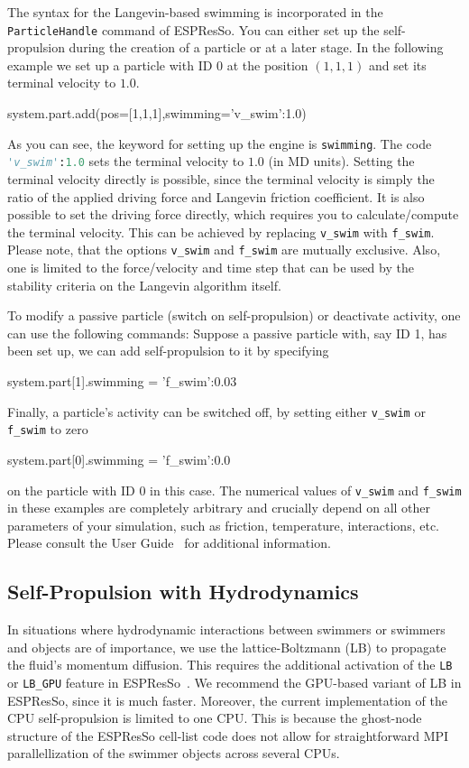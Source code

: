 \documentclass[aip,jcp,reprint,a4paper,onecolumn,amsmath]{revtex4-1}
\newcommand\code{\lstinline}
\newcommand{\es}{\mbox{\textsf{ESPResSo}}\xspace}
\newcommand\codees{\lstinline[language=python]}
\begin{document}
The syntax for the Langevin-based swimming is incorporated in the \codees{ParticleHandle} command of \es{}. You can either set up the self-propulsion during the creation of a particle or at a later stage. In the following example we set up a particle with ID 0 at the position $(1,1,1)$ and set its terminal velocity to $1.0$.
\begin{espresso}
system.part.add(pos=[1,1,1],swimming={'v_swim':1.0})
\end{espresso}
As you can see, the keyword for setting up the engine is \codees{swimming}. The code \codees{'v_swim':1.0} sets the terminal velocity to $1.0$ (in MD units). Setting the terminal velocity directly is possible, since the terminal velocity is simply the ratio of the applied driving force and Langevin friction coefficient. It is also possible to set the driving force directly, which requires you to calculate/compute the terminal velocity. This can be achieved by replacing \codees{v_swim} with \codees{f_swim}. Please note, that the options \codees{v_swim} and \codees{f_swim} are mutually exclusive. Also, one is limited to the force/velocity and time step that can be used by the stability criteria on the Langevin algorithm itself.

To modify a passive particle (switch on self-propulsion) or deactivate activity, one can use the following commands: Suppose a passive particle with, say ID 1, has been set up, we can add self-propulsion to it by specifying
\begin{espresso}
system.part[1].swimming = {'f_swim':0.03}
\end{espresso}
Finally, a particle's activity can be switched off, by setting either \codees{v_swim} or \codees{f_swim} to zero
\begin{espresso}
system.part[0].swimming = {'f_swim':0.0}
\end{espresso}
on the particle with ID 0 in this case. The numerical values of \codees{v_swim} and \codees{f_swim} in these examples are completely arbitrary and crucially depend on all other parameters of your simulation, such as friction, temperature, interactions, etc. Please consult the User Guide~\cite{UG} for additional information.

\subsection{\label{sub:lattice}Self-Propulsion with Hydrodynamics}

In situations where hydrodynamic interactions between swimmers or swimmers and objects are of importance, we use the lattice-Boltzmann (LB) to propagate the fluid's momentum diffusion. This requires the additional activation of the \code{LB} or \code{LB_GPU} feature in \es{}~\cite{UG,Arnold_13,roehm12}. We recommend the GPU-based variant of LB in \es{}, since it is much faster. Moreover, the current implementation of the CPU self-propulsion is limited to one CPU. This is because the ghost-node structure of the \es{} cell-list code does not allow for straightforward MPI parallellization of the swimmer objects across several CPUs.
\end{document}
